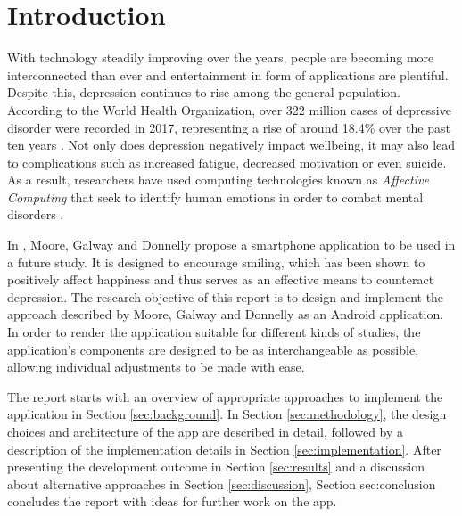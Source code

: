 \section{Introduction} \label{sec:introduction}
With technology steadily improving over the years, people are becoming more interconnected than ever and entertainment in form of applications are plentiful. Despite this, depression continues to rise among the general population. According to the World Health Organization, over 322 million cases of depressive disorder were recorded in 2017, representing a rise of around 18.4\% over the past ten years \cite{who_depression}. Not only does depression negatively impact wellbeing, it may also lead to complications such as increased fatigue, decreased motivation or even suicide. As a result, researchers have used computing technologies known as \textit{Affective Computing} that seek to identify human emotions in order to combat mental disorders \cite{ieee_affective}.

In \cite{sohappy}, Moore, Galway and Donnelly propose a smartphone application to be used in a future study. It is designed to encourage smiling, which has been shown to positively affect happiness and thus serves as an effective means to counteract depression. The research objective of this report is to design and implement the approach described by Moore, Galway and Donnelly as an Android application. In order to render the application suitable for different kinds of studies, the application's components are designed to be as interchangeable as possible, allowing individual adjustments to be made with ease.

The report starts with an overview of appropriate approaches to implement the application in Section \ref{sec:background}. In Section \ref{sec:methodology}, the design choices and architecture of the app are described in detail, followed by a description of the implementation details in Section \ref{sec:implementation}. After presenting the development outcome in Section \ref{sec:results} and a discussion about alternative approaches in Section \ref{sec:discussion}, Section {sec:conclusion} concludes the report with ideas for further work on the app.


